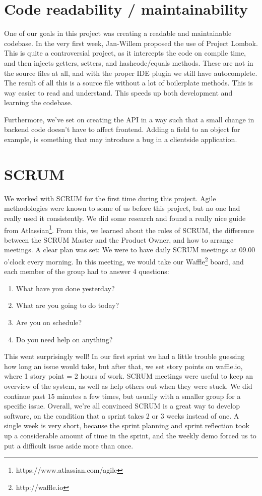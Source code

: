 \section{Code readability / maintainability}
One of our goals in this project was creating a readable and maintainable codebase.
In the very first week, Jan-Willem proposed the use of Project Lombok.
This is quite a controversial project, as it intercepts the code on compile time, and then injects getters, setters, and hashcode/equals methods.
These are not in the source files at all, and with the proper IDE plugin we still have autocomplete.
The result of all this is a source file without a lot of boilerplate methods.
This is way easier to read and understand.
This speeds up both development and learning the codebase.

Furthermore, we've set on creating the API in a way such that a small change in backend code doesn't have to affect frontend. Adding a field to an object for example, is something that may introduce a bug in a clientside application. 

\section{SCRUM}
We worked with SCRUM for the first time during this project.
Agile methodologies were known to some of us before this project, but no one had really used it consistently.
We did some research and found a really nice guide from Atlassian\footnote{https://www.atlassian.com/agile}.
From this, we learned about the roles of SCRUM, the difference between the SCRUM Master and the Product Owner, and how to arrange meetings.
A clear plan was set: We were to have daily SCRUM meetings at 09.00 o'clock every morning.
In this meeting, we would take our Waffle\footnote{http://waffle.io} board, and each member of the group had to answer 4 questions:
\begin{enumerate}
\item What have you done yesterday?
\item What are you going to do today?
\item Are you on schedule?
\item Do you need help on anything?
\end{enumerate}
This went surprisingly well!
In our first sprint we had a little trouble guessing how long an issue would take, but after that, we set story points on waffle.io, where 1 story point = 2 hours of work.
SCRUM meetings were useful to keep an overview of the system, as well as help others out when they were stuck.
We did continue past 15 minutes a few times, but usually with a smaller group for a specific issue.
Overall, we're all convinced SCRUM is a great way to develop software, on the condition that a sprint takes 2 or 3 weeks instead of one.
A single week is very short, because the sprint planning and sprint reflection took up a considerable amount of time in the sprint, and the weekly demo forced us to put a difficult issue aside more than once.


